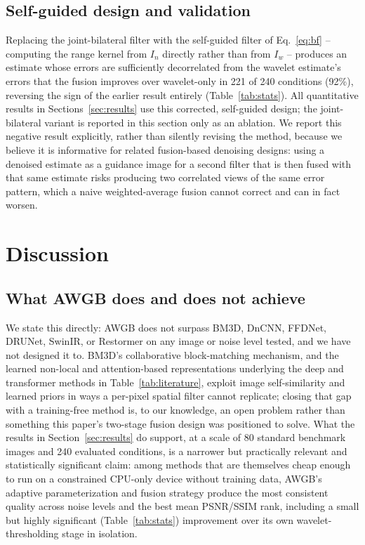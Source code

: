 \documentclass[final,3p,times,twocolumn,nopreprintline]{elsarticle}
\begin{document}
\subsection{Self-guided design and validation}
Replacing the joint-bilateral filter with the self-guided filter of Eq.~\eqref{eq:bf} -- computing the range kernel from $I_n$ directly rather than from $I_w$ -- produces an estimate whose errors are sufficiently decorrelated from the wavelet estimate's errors that the fusion improves over wavelet-only in 221 of 240 conditions (92\%), reversing the sign of the earlier result entirely (Table~\ref{tab:stats}). All quantitative results in Sections~\ref{sec:results} use this corrected, self-guided design; the joint-bilateral variant is reported in this section only as an ablation. We report this negative result explicitly, rather than silently revising the method, because we believe it is informative for related fusion-based denoising designs: using a denoised estimate as a guidance image for a second filter that is then fused with that same estimate risks producing two correlated views of the same error pattern, which a naive weighted-average fusion cannot correct and can in fact worsen.

\section{Discussion}
\label{sec:discussion}

\subsection{What AWGB does and does not achieve}
We state this directly: AWGB does not surpass BM3D, DnCNN, FFDNet, DRUNet, SwinIR, or Restormer on any image or noise level tested, and we have not designed it to. BM3D's collaborative block-matching mechanism, and the learned non-local and attention-based representations underlying the deep and transformer methods in Table~\ref{tab:literature}, exploit image self-similarity and learned priors in ways a per-pixel spatial filter cannot replicate; closing that gap with a training-free method is, to our knowledge, an open problem rather than something this paper's two-stage fusion design was positioned to solve. What the results in Section~\ref{sec:results} do support, at a scale of 80 standard benchmark images and 240 evaluated conditions, is a narrower but practically relevant and statistically significant claim: among methods that are themselves cheap enough to run on a constrained CPU-only device without training data, AWGB's adaptive parameterization and fusion strategy produce the most consistent quality across noise levels and the best mean PSNR/SSIM rank, including a small but highly significant (Table~\ref{tab:stats}) improvement over its own wavelet-thresholding stage in isolation.
\end{document}
